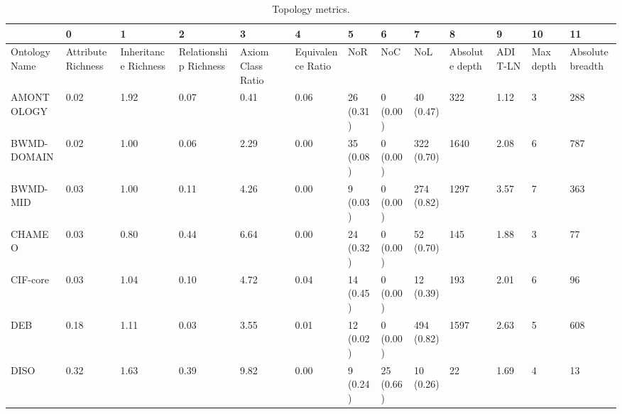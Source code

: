 \begin{table}
\centering
\caption{Topology metrics.}
\label{tab:topology-metrics}
\begin{tabular}{m{3.5cm}m{2cm}m{2cm}m{2cm}m{2cm}m{2cm}m{2cm}m{2cm}m{2cm}m{2cm}m{2cm}m{2cm}m{2cm}}
\toprule
{} &                  0  &                    1  &                     2  &                 3  &                 4  &          5  &          6  &           7  &              8  &       9  &         10 &                11 \\
\midrule
Ontology Name             &  Attribute Richness &  Inheritance Richness &  Relationship Richness &  Axiom Class Ratio &  Equivalence Ratio &         NoR &         NoC &          NoL &  Absolute depth &  ADIT-LN &  Max depth &  Absolute breadth \\
AMONTOLOGY              &                0.02 &                  1.92 &                   0.07 &               0.41 &               0.06 &   26 (0.31) &    0 (0.00) &    40 (0.47) &             322 &     1.12 &          3 &               288 \\
BWMD-DOMAIN             &                0.02 &                  1.00 &                   0.06 &               2.29 &               0.00 &   35 (0.08) &    0 (0.00) &   322 (0.70) &            1640 &     2.08 &          6 &               787 \\
BWMD-MID                &                0.03 &                  1.00 &                   0.11 &               4.26 &               0.00 &    9 (0.03) &    0 (0.00) &   274 (0.82) &            1297 &     3.57 &          7 &               363 \\
CHAMEO                  &                0.03 &                  0.80 &                   0.44 &               6.64 &               0.00 &   24 (0.32) &    0 (0.00) &    52 (0.70) &             145 &     1.88 &          3 &                77 \\
CIF-core                &                0.03 &                  1.04 &                   0.10 &               4.72 &               0.04 &   14 (0.45) &    0 (0.00) &    12 (0.39) &             193 &     2.01 &          6 &                96 \\
DEB                     &                0.18 &                  1.11 &                   0.03 &               3.55 &               0.01 &   12 (0.02) &    0 (0.00) &   494 (0.82) &            1597 &     2.63 &          5 &               608 \\
DISO                    &                0.32 &                  1.63 &                   0.39 &               9.82 &               0.00 &    9 (0.24) &   25 (0.66) &    10 (0.26) &              22 &     1.69 &          4 &                13 \\

\end{tabular}
\end{table}

